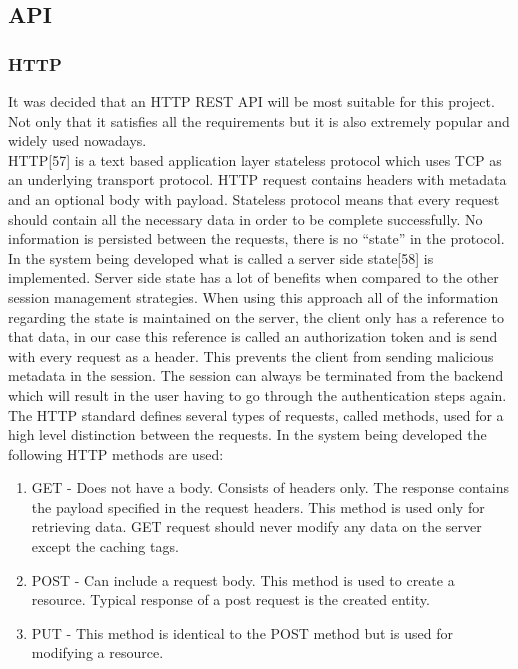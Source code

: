 \documentclass{article}
\begin{document}
\pagebreak
	\subsection{API}
			\subsubsection{HTTP}
			It was decided that an HTTP REST API will be most suitable for this project. Not only that it satisfies all the requirements but it is also extremely popular and widely used nowadays. \\

HTTP[57] is a text based application layer stateless protocol which uses TCP as an underlying transport protocol. HTTP request contains headers with metadata and an optional body with payload. Stateless protocol means that every request should contain all the necessary data in order to be complete successfully. No information is persisted between the requests, there is no “state” in the protocol. In the system being developed what is called a server side state[58] is implemented. Server side state has a lot of benefits when compared to the other session management strategies. When using this approach all of the information regarding the state is maintained on the server, the client only has a reference to that data, in our case this reference is called an authorization token and is send with every request as a header. This prevents the client from sending malicious metadata in the session. The session can always be terminated from the backend which will result in the user having to go through the authentication steps again. \\

The HTTP standard defines several types of requests, called methods, used for a high level distinction between the requests. In the system being developed the following HTTP methods are used:
\begin{enumerate}
\item GET - Does not have a body. Consists of headers only. The response contains the payload specified in the request headers. This method is used only for retrieving data. GET request should never modify any data on the server except the caching tags.
\item POST - Can include a request body. This method is used to create a resource. Typical response of a post request is the created entity.
\item PUT - This method is identical to the POST method but is used for modifying a resource.
\end{enumerate}
\end{document}
